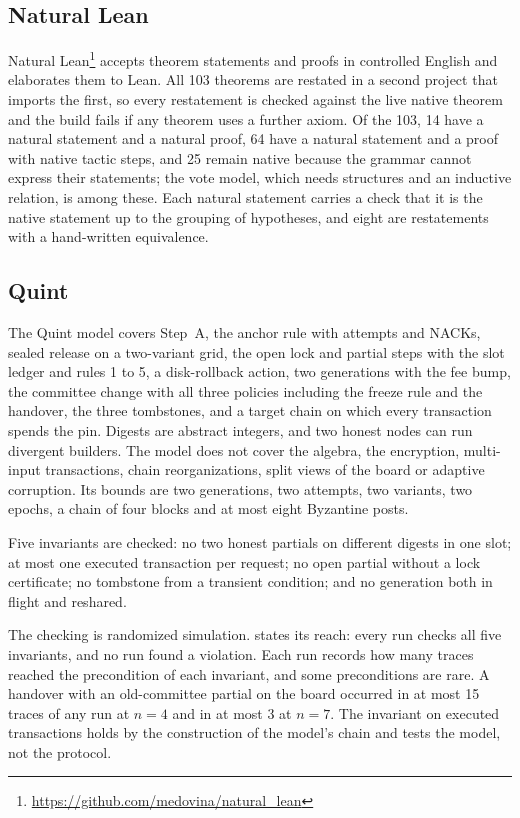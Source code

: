 \subsection{Natural Lean}

Natural Lean\footnote{\url{https://github.com/medovina/natural_lean}} accepts theorem statements and proofs in controlled English and elaborates them to Lean. All 103 theorems are restated in a second project that imports the first, so every restatement is checked against the live native theorem and the build fails if any theorem uses a further axiom. Of the 103, 14 have a natural statement and a natural proof, 64 have a natural statement and a proof with native tactic steps, and 25 remain native because the grammar cannot express their statements; the vote model, which needs structures and an inductive relation, is among these. Each natural statement carries a check that it is the native statement up to the grouping of hypotheses, and eight are restatements with a hand-written equivalence.

\subsection{Quint}

The Quint model covers Step~A, the anchor rule with attempts and NACKs, sealed release on a two-variant grid, the open lock and partial steps with the slot ledger and rules 1 to 5, a disk-rollback action, two generations with the fee bump, the committee change with all three policies including the freeze rule and the handover, the three tombstones, and a target chain on which every transaction spends the pin. Digests are abstract integers, and two honest nodes can run divergent builders. The model does not cover the algebra, the encryption, multi-input transactions, chain reorganizations, split views of the board or adaptive corruption. Its bounds are two generations, two attempts, two variants, two epochs, a chain of four blocks and at most eight Byzantine posts.

Five invariants are checked: no two honest partials on different digests in one slot; at most one executed transaction per request; no open partial without a lock certificate; no tombstone from a transient condition; and no generation both in flight and reshared.

The checking is randomized simulation.  states its reach: every run checks all five invariants, and no run found a violation. Each run records how many traces reached the precondition of each invariant, and some preconditions are rare. A handover with an old-committee partial on the board occurred in at most 15 traces of any run at $n = 4$ and in at most 3 at $n = 7$. The invariant on executed transactions holds by the construction of the model's chain and tests the model, not the protocol.

